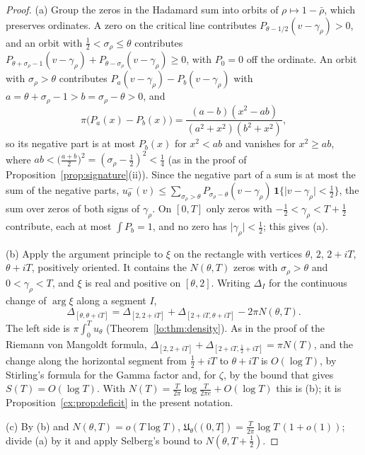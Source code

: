 \begin{proof}
(a) Group the zeros in the Hadamard sum into orbits of $\rho\mapsto1-\bar\rho$, which preserves ordinates. A zero on the critical line contributes $P_{\theta-1/2}(v-\gamma_\rho)>0$, and an orbit with $\frac12<\sigma_\rho\le\theta$ contributes $P_{\theta+\sigma_\rho-1}(v-\gamma_\rho)+P_{\theta-\sigma_\rho}(v-\gamma_\rho)\ge0$, with $P_0=0$ off the ordinate. An orbit with $\sigma_\rho>\theta$ contributes $P_a(v-\gamma_\rho)-P_b(v-\gamma_\rho)$ with $a=\theta+\sigma_\rho-1>b=\sigma_\rho-\theta>0$, and
\[
\pi\bigl(P_a(x)-P_b(x)\bigr)=\frac{(a-b)(x^2-ab)}{(a^2+x^2)(b^2+x^2)},
\]
so its negative part is at most $P_b(x)$ for $x^2<ab$ and vanishes for $x^2\ge ab$, where $ab<\bigl(\frac{a+b}2\bigr)^2=(\sigma_\rho-\frac12)^2<\frac14$ (as in the proof of Proposition~\ref{prop:signature}(ii)). Since the negative part of a sum is at most the sum of the negative parts, $u_\theta^-(v)\le\sum_{\sigma_\rho>\theta}P_{\sigma_\rho-\theta}(v-\gamma_\rho)\,\mathbf 1\{\lvert v-\gamma_\rho\rvert<\frac12\}$, the sum over zeros of both signs of $\gamma_\rho$. On $[0,T]$ only zeros with $-\frac12<\gamma_\rho<T+\frac12$ contribute, each at most $\int P_b=1$, and no zero has $\lvert\gamma_\rho\rvert<\frac12$; this gives (a).

(b) Apply the argument principle to $\xi$ on the rectangle with vertices $\theta$, $2$, $2+iT$, $\theta+iT$, positively oriented. It contains the $N(\theta,T)$ zeros with $\sigma_\rho>\theta$ and $0<\gamma_\rho<T$, and $\xi$ is real and positive on $[\theta,2]$. Writing $\Delta_I$ for the continuous change of $\arg\xi$ along a segment $I$,
\[
\Delta_{[\theta,\theta+iT]}=\Delta_{[2,2+iT]}+\Delta_{[2+iT,\theta+iT]}-2\pi N(\theta,T).
\]
The left side is $\pi\int_0^Tu_\theta$ (Theorem~\ref{lo:thm:density}). As in the proof of the Riemann von Mangoldt formula, $\Delta_{[2,2+iT]}+\Delta_{[2+iT,\frac12+iT]}=\pi N(T)$, and the change along the horizontal segment from $\frac12+iT$ to $\theta+iT$ is $O(\log T)$, by Stirling's formula for the Gamma factor and, for $\zeta$, by the bound that gives $S(T)=O(\log T)$. With $N(T)=\frac T{2\pi}\log\frac T{2\pi e}+O(\log T)$ this is (b); it is Proposition~\ref{cx:prop:deficit} in the present notation.

(c) By (b) and $N(\theta,T)=o(T\log T)$, $\mathfrak U_\theta((0,T])=\frac T{2\pi}\log T\,(1+o(1))$; divide (a) by it and apply Selberg's bound to $N(\theta,T+\frac12)$.
\end{proof}

